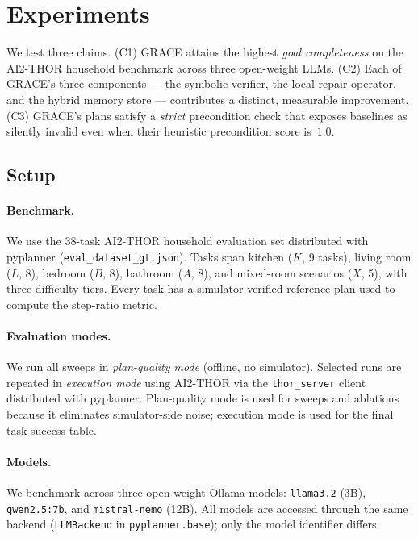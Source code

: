 
\section{Experiments}\label{sec:experiments}

We test three claims. (C1) GRACE attains the highest \emph{goal
completeness} on the AI2-THOR household benchmark across three
open-weight LLMs. (C2) Each of GRACE's three components --- the
symbolic verifier, the local repair operator, and the hybrid memory
store --- contributes a distinct, measurable improvement. (C3)
GRACE's plans satisfy a \emph{strict} precondition check that
exposes baselines as silently invalid even when their heuristic
precondition score is~$1.0$.

\subsection{Setup}\label{sec:setup}

\paragraph{Benchmark.}
We use the 38-task AI2-THOR household evaluation set distributed with
pyplanner (\texttt{eval\_dataset\_gt.json}). Tasks span kitchen
($K$, 9 tasks), living room ($L$, 8), bedroom ($B$, 8), bathroom
($A$, 8), and mixed-room scenarios ($X$, 5), with three difficulty
tiers. Every task has a simulator-verified reference plan used to
compute the step-ratio metric.

\paragraph{Evaluation modes.}
We run all sweeps in \emph{plan-quality mode} (offline, no
simulator). Selected runs are repeated in \emph{execution mode} using
AI2-THOR via the \texttt{thor\_server} client distributed with
pyplanner. Plan-quality mode is used for sweeps and ablations because
it eliminates simulator-side noise; execution mode is used for the
final task-success table.

\paragraph{Models.}
We benchmark across three open-weight Ollama models: \texttt{llama3.2}
(3B), \texttt{qwen2.5:7b}, and \texttt{mistral-nemo} (12B). All models
are accessed through the same backend (\texttt{LLMBackend} in
\texttt{pyplanner.base}); only the model identifier differs.

